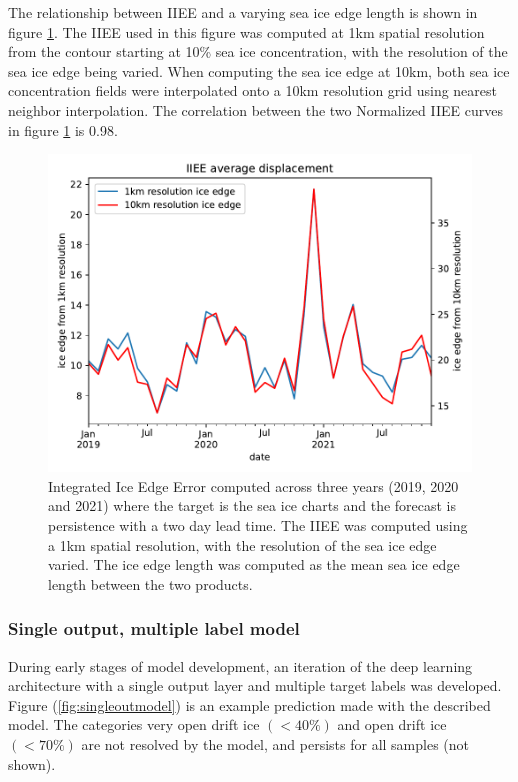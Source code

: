 \documentclass[../main/thesis]{subfiles}
\begin{document}
The relationship between IIEE and a varying sea ice edge length is shown in figure \ref{fig:iiee_1km_10km}. The IIEE used in this figure was computed at 1km spatial resolution from the contour starting at 10\% sea ice concentration, with the resolution of the sea ice edge being varied. When computing the sea ice edge at 10km, both sea ice concentration fields were interpolated onto a 10km resolution grid using nearest neighbor interpolation. The correlation between the two Normalized IIEE curves in figure \ref{fig:iiee_1km_10km} is 0.98.

\begin{figure}
    \centering
    \includegraphics[width=.62\textwidth]{normalized_iiee}
    \caption{\label{fig:iiee_1km_10km}Integrated Ice Edge Error computed across three years (2019, 2020 and 2021) where the target is the sea ice charts and the forecast is persistence with a two day lead time. The IIEE was computed using a 1km spatial resolution, with the resolution of the sea ice edge varied. The ice edge length was computed as the mean sea ice edge length between the two products.}
\end{figure}

\subsubsection{Single output, multiple label model}
\label{sec:singleoutputmodel}
During early stages of model development, an iteration of the deep learning architecture with a single output layer and multiple target labels was developed. Figure (\ref{fig:singleoutmodel}) is an example prediction made with the described model. The categories very open drift ice $(<40\%)$ and open drift ice $(<70\%)$ are not resolved by the model, and persists for all samples (not shown). 
\end{document}
